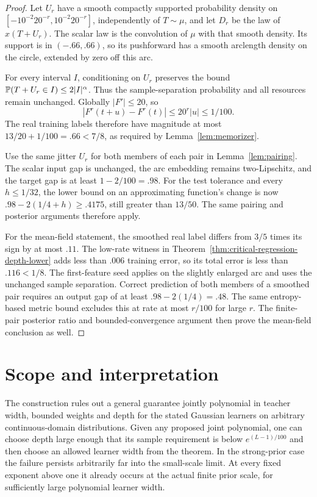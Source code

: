 \documentclass[11pt]{article}
\theoremstyle{remark}\newtheorem{remark}[theorem]{Remark}
\begin{document}
\begin{proof}
Let $U_r$ have a smooth compactly supported probability density on
$[-10^{-2}20^{-r},10^{-2}20^{-r}]$, independently of $T\sim\mu$,
and let $D_r$ be the law of $x(T+U_r)$. The scalar law is the
convolution of $\mu$ with that smooth density. Its support is in
$(-.66,.66)$, so its pushforward has a smooth arclength density on
the circle, extended by zero off this arc.

For every interval $I$, conditioning on $U_r$ preserves the bound
$\mathbb P(T+U_r\in I)\le2|I|^\alpha$. Thus the sample-separation
probability and all resources remain unchanged. Globally $|F'|\le20$,
so
\[
 |F^r(t+u)-F^r(t)|\le20^r|u|\le1/100.
\]
The real training labels therefore have magnitude at most
$13/20+1/100=.66<7/8$, as required by
Lemma~\ref{lem:memorizer}.

Use the same jitter $U_r$ for both members of each pair in
Lemma~\ref{lem:pairing}. The scalar input gap is unchanged, the arc
embedding remains two-Lipschitz, and the target gap is at least
$1-2/100=.98$. For the test tolerance and every $h\le1/32$, the
lower bound on an approximating function's change is now
$.98-2(1/4+h)\ge.4175$, still greater than $13/50$.
The same pairing and posterior arguments therefore apply.

For the mean-field statement, the smoothed real label differs from
$3/5$ times its sign by at most $.11$. The low-rate witness in
Theorem~\ref{thm:critical-regression-depth-lower} adds less than
$.006$ training error, so its total error is less than $.116<1/8$.
The first-feature seed applies on the slightly enlarged arc and
uses the unchanged sample separation. Correct prediction of both
members of a smoothed pair requires an output gap of at least
$.98-2(1/4)=.48$. The same entropy-based metric bound excludes this
at rate at most $r/100$ for large $r$. The finite-pair posterior
ratio and bounded-convergence argument then prove the mean-field
conclusion as well.
\end{proof}

\section{Scope and interpretation}
The construction rules out a general guarantee jointly polynomial in
teacher width, bounded weights and depth for the stated Gaussian learners
on arbitrary continuous-domain distributions. Given any proposed joint
polynomial, one can choose depth large enough that its sample requirement
is below $e^{(L-1)/100}$ and then choose an allowed learner width from
the theorem. In the strong-prior case the failure persists arbitrarily
far into the small-scale limit. At every fixed exponent above one it
already occurs at the actual finite prior scale, for sufficiently large
polynomial learner width.
\end{document}
